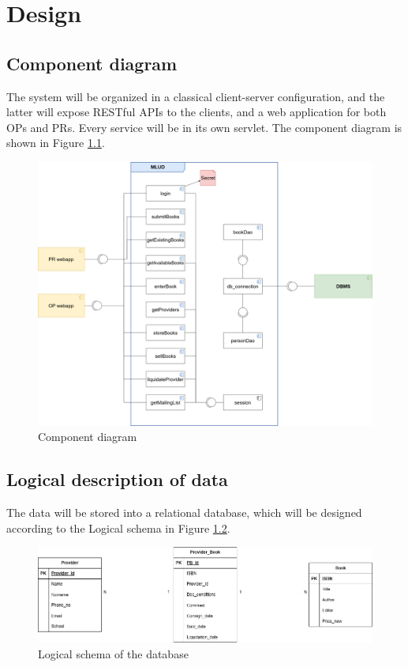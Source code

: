 \chapter{Design}




\section{Component diagram}

The system will be organized in a classical client-server configuration, and the latter will expose RESTful APIs to the clients, and a web application for both OPs and PRs. Every service will be in its own servlet. The component diagram is shown in Figure \ref{fig:component}.

\begin{figure}[h]
    \centering
    \includegraphics[width=\textwidth]{assets/component_diagram.png}
    \caption{Component diagram}
    \label{fig:component}
\end{figure}

\section{Logical description of data}

The data will be stored into a relational database, which will be designed according to the Logical schema in Figure \ref{fig:er}.

\begin{figure}[h]
    \centering
    \includegraphics[width=\textwidth]{assets/er_diagram.png}
    \caption{Logical schema of the database}
    \label{fig:er}
\end{figure}

